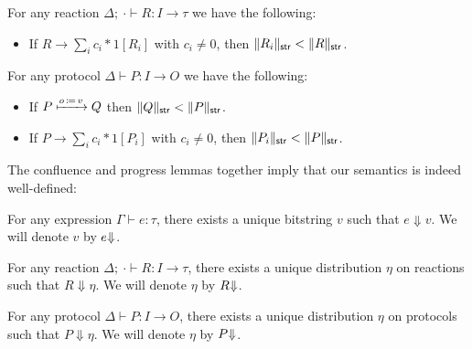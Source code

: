 \begin{lemma}
For any reaction $\Delta; \ \cdot \vdash R : I \to \tau$ we have the following:
\begin{itemize}
\item If $R \to \sum_i c_i * 1[R_i]$ with $c_i \neq 0$, then $\Vert R_i \Vert_{\mathsf{str}} < \Vert R \Vert_{\mathsf{str}}$.
\end{itemize}
\end{lemma}

\begin{lemma}
For any protocol $\Delta \vdash P : I \to O$ we have the following:
\begin{itemize}
\item If $P \xmapsto{o \, \coloneqq \, v} Q$ then $\Vert Q \Vert_{\mathsf{str}} < \Vert P \Vert_{\mathsf{str}}$.
\item If $P \to \sum_i c_i * 1[P_i]$ with $c_i \neq 0$, then $\Vert P_i \Vert_{\mathsf{str}} < \Vert P \Vert_{\mathsf{str}}$.
\end{itemize}
\end{lemma}

\noindent The confluence and progress lemmas together imply that our semantics is indeed well-defined:

\begin{corollary}
For any expression $\Gamma \vdash e : \tau$, there exists a unique bitstring $v$ such that $e \Downarrow v$. We will denote $v$ by ${e \hspace{-2.5pt} \Downarrow}$.
\end{corollary}

\begin{corollary}
For any reaction $\Delta; \ \cdot \vdash R : I \to \tau$, there exists a unique distribution $\eta$ on reactions such that $R \Downarrow \eta$. We will denote $\eta$ by ${R \hspace{-2.5pt} \Downarrow}$.
\end{corollary}

\begin{corollary}
For any protocol $\Delta \vdash P : I \to O$, there exists a unique distribution $\eta$ on protocols such that $P \Downarrow \eta$. We will denote $\eta$ by ${P \hspace{-2.5pt} \Downarrow}$.
\end{corollary}
